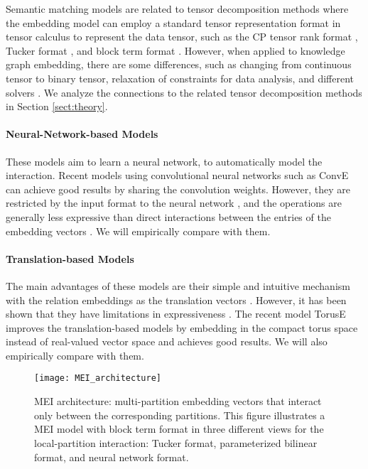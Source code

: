 \documentclass{ecai}
\theoremstyle{plain}  \newtheorem{thm}{Theorem}  \newtheorem{lem}[thm]{Lemma}  \newtheorem{prop}[thm]{Proposition}
\theoremstyle{remark}  \newtheorem*{rem}{Remark}
\begin{document}
Semantic matching models are related to tensor decomposition methods where the embedding model can employ a standard tensor representation format in tensor calculus to represent the data tensor, such as the CP tensor rank format \cite{hitchcock_expressiontensorpolyadic_1927}, Tucker format \cite{tucker_mathematicalnotesthreemode_1966}, and block term format \cite{delathauwer_decompositionshigherordertensor_2008a}. However, when applied to knowledge graph embedding, there are some differences, such as changing from continuous tensor to binary tensor, relaxation of constraints for data analysis, and different solvers \cite{kolda_tensordecompositionsapplications_2009}. We analyze the connections to the related tensor decomposition methods in Section \ref{sect:theory}.

\paragraph{Neural-Network-based Models}
These models aim to learn a neural network, to automatically model the interaction. Recent models using convolutional neural networks such as ConvE \cite{dettmers_convolutional2dknowledge_2018} can achieve good results by sharing the convolution weights. However, they are restricted by the input format to the neural network \cite{dettmers_convolutional2dknowledge_2018}, and the operations are generally less expressive than direct interactions between the entries of the embedding vectors \cite{nickel_holographicembeddingsknowledge_2016}. We will empirically compare with them.

\paragraph{Translation-based Models}
The main advantages of these models are their simple and intuitive mechanism with the relation embeddings as the translation vectors \cite{bordes_translatingembeddingsmodeling_2013}. However, it has been shown that they have limitations in expressiveness \cite{kazemi_simpleembeddinglink_2018}. The recent model TorusE \cite{ebisu_toruseknowledgegraph_2018} improves the translation-based models by embedding in the compact torus space instead of real-valued vector space and achieves good results. We will also empirically compare with them.


\begin{figure*}[t]
	\centering
	\texttt{[image: MEI\_architecture]}
	\caption{MEI architecture: multi-partition embedding vectors that interact only between the corresponding partitions. This figure illustrates a MEI model with block term format in three different views for the local-partition interaction: Tucker format, parameterized bilinear format, and neural network format.}
	\label{fig:mei_architecture}
\end{figure*}
\end{document}

